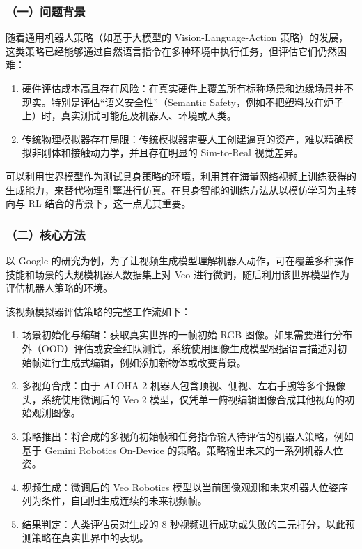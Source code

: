 \hypertarget{ux4e00ux95eeux9898ux80ccux666f-18}{%
\subsubsection{（一）问题背景}\label{ux4e00ux95eeux9898ux80ccux666f-18}}

随着通用机器人策略（如基于大模型的 Vision-Language-Action 策略）的发展，这类策略已经能够通过自然语言指令在多种环境中执行任务，但评估它们仍然困难：

\begin{enumerate}
\def\labelenumi{\arabic{enumi}.}
\tightlist
\item
  硬件评估成本高且存在风险：在真实硬件上覆盖所有标称场景和边缘场景并不现实。特别是评估``语义安全性''（Semantic Safety，例如不把塑料放在炉子上）时，真实测试可能危及机器人、环境或人类。
\item
  传统物理模拟器存在局限：传统模拟器需要人工创建逼真的资产，难以精确模拟非刚体和接触动力学，并且存在明显的 Sim-to-Real 视觉差异。
\end{enumerate}

可以利用世界模型作为测试具身策略的环境，利用其在海量网络视频上训练获得的生成能力，来替代物理引擎进行仿真。在具身智能的训练方法从以模仿学习为主转向与 RL 结合的背景下，这一点尤其重要。

\hypertarget{ux4e8cux6838ux5fc3ux65b9ux6cd5}{%
\subsubsection{（二）核心方法}\label{ux4e8cux6838ux5fc3ux65b9ux6cd5}}

以 Google 的研究为例，为了让视频生成模型理解机器人动作，可在覆盖多种操作技能和场景的大规模机器人数据集上对 Veo 进行微调，随后利用该世界模型作为评估机器人策略的环境。

该视频模拟器评估策略的完整工作流如下：

\begin{enumerate}
\def\labelenumi{\arabic{enumi}.}
\tightlist
\item
  场景初始化与编辑：获取真实世界的一帧初始 RGB 图像。如果需要进行分布外（OOD）评估或安全红队测试，系统使用图像生成模型根据语言描述对初始帧进行生成式编辑，例如添加新物体或改变背景。
\item
  多视角合成：由于 ALOHA 2 机器人包含顶视、侧视、左右手腕等多个摄像头，系统使用微调后的 Veo 2 模型，仅凭单一俯视编辑图像合成其他视角的初始观测图像。
\item
  策略推出：将合成的多视角初始帧和任务指令输入待评估的机器人策略，例如基于 Gemini Robotics On-Device 的策略。策略输出未来的一系列机器人位姿。
\item
  视频生成：微调后的 Veo Robotics 模型以当前图像观测和未来机器人位姿序列为条件，自回归生成连续的未来视频帧。
\item
  结果判定：人类评估员对生成的 8 秒视频进行成功或失败的二元打分，以此预测策略在真实世界中的表现。
\end{enumerate}

